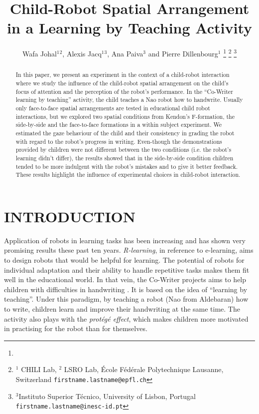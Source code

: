 \documentclass[letterpaper, 10 pt, conference]{ieeeconf}  %
\title{\LARGE \bf
Child-Robot Spatial Arrangement in a Learning by Teaching Activity}
\author{Wafa Johal$^{1}$$^{2}$, Alexis Jacq$^{1}$$^{3}$, Ana Paiva$^{3}$ and Pierre Dillenbourg$^{1}$  %
\thanks{}%
\thanks{$^{1}$ CHILI Lab,
	$^{2}$ LSRO Lab,
        \'{E}cole F\'{e}d\'{e}rale Polytechnique Lausanne, Switzerland
        {\tt\small firstname.lastname@epfl.ch}}%
\thanks{$^{3}$Instituto Superior T\'{e}cnico, University of Lisbon, Portugal
        {\tt\small firstname.lastname@inesc-id.pt}}%
}
\begin{document}
\maketitle


\begin{abstract}
In this paper, we present an experiment in the context of a child-robot interaction where we study the influence of the child-robot spatial arrangement on the child's focus of attention and the perception of the robot's performance. In the ``Co-Writer learning by teaching'' activity, the child teaches a Nao robot how to handwrite.
Usually only face-to-face spatial arrangements are tested in educational child robot interactions, but we explored two spatial conditions from Kendon's F-formation, the side-by-side and the face-to-face formations in a within subject experiment.
We estimated the gaze behaviour of the child and their consistency in grading the robot with regard to the robot's progress in writing. 
Even-though the demonstrations provided by children were not different between the two conditions (i.e. the robot's learning didn't differ),  the results showed that in the side-by-side condition children tended to be more indulgent with the robot's mistakes and to give it better feedback.
These results highlight the influence of experimental choices in child-robot interaction.
\end{abstract}


\section{INTRODUCTION}

Application of robots in learning tasks has been increasing and has shown very promising results these past ten years. 
\emph{R-learning}, in reference to e-learning, aims to design robots that would be helpful for learning.
The potential of robots for individual adaptation and their ability to handle repetitive tasks makes them fit well in the educational world.
In that vein, the Co-Writer projects aims to help children with difficulties in handwriting \cite{hood2015when}.
It is based on the idea of ``learning by teaching''.
Under this paradigm, by teaching a robot (Nao from Aldebaran) how to write, children learn and improve their handwriting at the same time.
The activity also plays with the \emph{protégé effect}, which makes children more motivated in practising for the robot than for themselves.
\end{document}
